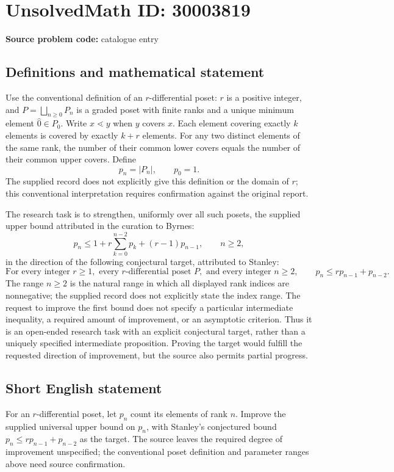 \documentclass[11pt]{article}
\begin{document}
\section*{UnsolvedMath ID: 30003819}
\textbf{Source problem code:} catalogue entry
\subsection{Definitions and mathematical statement}
Use the conventional definition of an \(r\)-differential poset: \(r\) is a positive integer, and \(P=\bigsqcup_{n\geq 0}P_n\) is a graded poset with finite ranks and a unique minimum element \(\hat 0\in P_0\). Write \(x\lessdot y\) when \(y\) covers \(x\). Each element covering exactly \(k\) elements is covered by exactly \(k+r\) elements. For any two distinct elements of the same rank, the number of their common lower covers equals the number of their common upper covers. Define
\[
p_n=|P_n|,\qquad p_0=1.
\]
The supplied record does not explicitly give this definition or the domain of \(r\); this conventional interpretation requires confirmation against the original report.

The research task is to strengthen, uniformly over all such posets, the supplied upper bound attributed in the curation to Byrnes:
\[
p_n\leq 1+r\sum_{k=0}^{n-2}p_k+(r-1)p_{n-1},\qquad n\geq 2,
\]
in the direction of the following conjectural target, attributed to Stanley:
\[
\text{For every integer }r\geq 1,\text{ every }r\text{-differential poset }P,
\text{ and every integer }n\geq 2,\qquad
p_n\leq r p_{n-1}+p_{n-2}.
\]
The range \(n\geq 2\) is the natural range in which all displayed rank indices are nonnegative; the supplied record does not explicitly state the index range. The request to improve the first bound does not specify a particular intermediate inequality, a required amount of improvement, or an asymptotic criterion. Thus it is an open-ended research task with an explicit conjectural target, rather than a uniquely specified intermediate proposition. Proving the target would fulfill the requested direction of improvement, but the source also permits partial progress.
\subsection{Short English statement}
For an \(r\)-differential poset, let \(p_n\) count its elements of rank \(n\). Improve the supplied universal upper bound on \(p_n\), with Stanley's conjectured bound \(p_n\leq r p_{n-1}+p_{n-2}\) as the target. The source leaves the required degree of improvement unspecified; the conventional poset definition and parameter ranges above need source confirmation.
\end{document}
